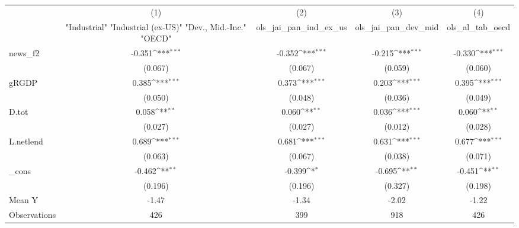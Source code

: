 {
\def\sym#1{\ifmmode^{#1}\else\(^{#1}\)\fi}
\begin{tabular}{l*{4}{c}}
\toprule
            &\multicolumn{1}{c}{(1)}&\multicolumn{1}{c}{(2)}&\multicolumn{1}{c}{(3)}&\multicolumn{1}{c}{(4)}\\
            &\multicolumn{1}{c}{ "Industrial" "Industrial (ex-US)" "Dev., Mid.-Inc." "OECD" }&\multicolumn{1}{c}{ols\_jai\_pan\_ind\_ex\_us}&\multicolumn{1}{c}{ols\_jai\_pan\_dev\_mid}&\multicolumn{1}{c}{ols\_al\_tab\_oecd}\\
\midrule
news\_f2     &      -0.351\sym{***}&      -0.352\sym{***}&      -0.215\sym{***}&      -0.330\sym{***}\\
            &     (0.067)         &     (0.067)         &     (0.059)         &     (0.060)         \\
\addlinespace
gRGDP       &       0.385\sym{***}&       0.373\sym{***}&       0.203\sym{***}&       0.395\sym{***}\\
            &     (0.050)         &     (0.048)         &     (0.036)         &     (0.049)         \\
\addlinespace
D.tot       &       0.058\sym{**} &       0.060\sym{**} &       0.036\sym{***}&       0.060\sym{**} \\
            &     (0.027)         &     (0.027)         &     (0.012)         &     (0.028)         \\
\addlinespace
L.netlend   &       0.689\sym{***}&       0.681\sym{***}&       0.631\sym{***}&       0.677\sym{***}\\
            &     (0.063)         &     (0.067)         &     (0.038)         &     (0.071)         \\
\addlinespace
\_cons      &      -0.462\sym{**} &      -0.399\sym{*}  &      -0.695\sym{**} &      -0.451\sym{**} \\
            &     (0.196)         &     (0.196)         &     (0.327)         &     (0.198)         \\
\midrule
Mean Y      &       -1.47         &       -1.34         &       -2.02         &       -1.22         \\
Observations&         426         &         399         &         918         &         426         \\
\bottomrule
\end{tabular}
}
